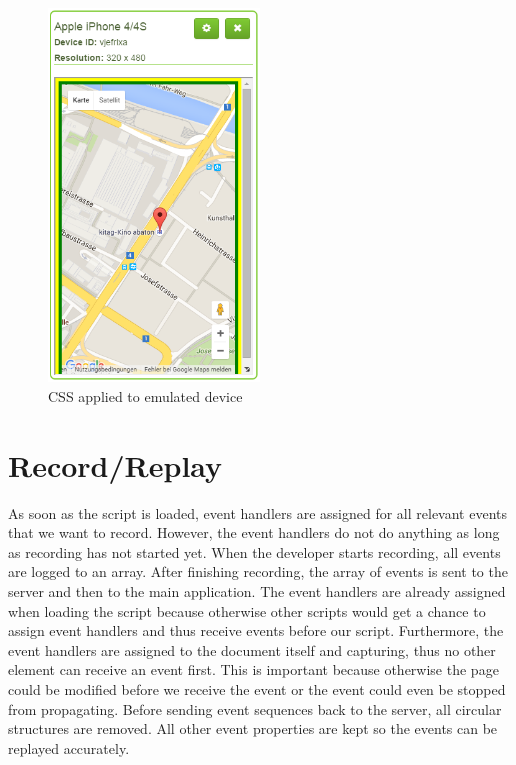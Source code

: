 \begin{figure}[H]
  \centering
    \includegraphics[width=0.5\textwidth]{images/screenshots/emulated_device_2.png}
	\caption{CSS applied to emulated device}
	\label{fig:css_applied}
\end{figure}

\section{Record/Replay}

As soon as the script is loaded, event handlers are assigned for all relevant events that we want to record. However, the event handlers do not do anything as long as recording has not started yet. When the developer starts recording, all events are logged to an array. After finishing recording, the array of events is sent to the server and then to the main application. The event handlers are already assigned when loading the script because otherwise other scripts would get a chance to assign event handlers and thus receive events before our script. Furthermore, the event handlers are assigned to the document itself and capturing, thus no other element can receive an event first. This is important because otherwise the page could be modified before we receive the event or the event could even be stopped from propagating. Before sending event sequences back to the server, all circular structures are removed. All other event properties are kept so the events can be replayed accurately.

